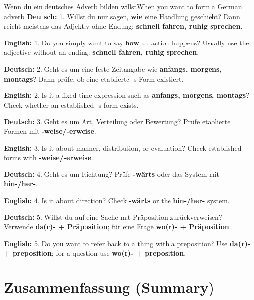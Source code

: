 \documentclass[a4paper,11pt]{article}
\newcommand{\GermanText}[1]{\textbf{Deutsch: }#1\par}
\newcommand{\EnglishText}[1]{{\small\color{SoftGray}\textbf{English: }#1\par}}
\newcommand{\BSection}[2]{\section{#1 \textnormal{\small (#2)}}}
\begin{document}
\begin{grammarentry}{Wenn du ein deutsches Adverb bilden willst}{When you want to form a German adverb}
\GermanText{1. Willst du nur sagen, \textbf{wie} eine Handlung geschieht? Dann reicht meistens das Adjektiv ohne Endung: \textbf{schnell fahren, ruhig sprechen}.}
\EnglishText{1. Do you simply want to say \textbf{how} an action happens? Usually use the adjective without an ending: \textbf{schnell fahren, ruhig sprechen}.}

\GermanText{2. Geht es um eine feste Zeitangabe wie \textbf{anfangs, morgens, montags}? Dann prüfe, ob eine etablierte -s-Form existiert.}
\EnglishText{2. Is it a fixed time expression such as \textbf{anfangs, morgens, montags}? Check whether an established -s form exists.}

\GermanText{3. Geht es um Art, Verteilung oder Bewertung? Prüfe etablierte Formen mit \textbf{-weise/-erweise}.}
\EnglishText{3. Is it about manner, distribution, or evaluation? Check established forms with \textbf{-weise/-erweise}.}

\GermanText{4. Geht es um Richtung? Prüfe \textbf{-wärts} oder das System mit \textbf{hin-/her-}.}
\EnglishText{4. Is it about direction? Check \textbf{-wärts} or the \textbf{hin-/her-} system.}

\GermanText{5. Willst du auf eine Sache mit Präposition zurückverweisen? Verwende \textbf{da(r)- + Präposition}; für eine Frage \textbf{wo(r)- + Präposition}.}
\EnglishText{5. Do you want to refer back to a thing with a preposition? Use \textbf{da(r)- + preposition}; for a question use \textbf{wo(r)- + preposition}.}
\end{grammarentry}

\BSection{Zusammenfassung}{Summary}
\end{document}
